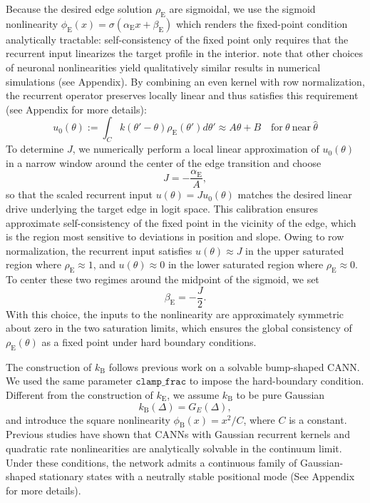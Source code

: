 \documentclass{article}
\newcommand{\rhoE}{\rho_{\text{E}}}
\newcommand{\kB}{k_{\text{B}}}
\newcommand{\kE}{k_{\text{E}}}
\newcommand{\phiB}{\phi_{\text{B}}}
\newcommand{\phiE}{\phi_{\text{E}}}
\newcommand{\alphaE}{\alpha_{\text{E}}}
\newcommand{\betaE}{\beta_{\text{E}}}
\begin{document}
Because the desired edge solution $\rhoE$ are sigmoidal, we use the sigmoid nonlinearity $\phiE(x)=\sigma(\alphaE x + \betaE)$ which renders the fixed-point condition analytically tractable:  self-consistency of the fixed point only requires that the recurrent input linearizes the target profile in the interior. note that other choices of neuronal nonlinearities yield qualitatively similar results in numerical simulations (see Appendix). By combining an even kernel with row normalization, the recurrent operator preserves locally linear and thus satisfies this requirement (see Appendix for more details):
\begin{equation}
    u_0(\theta):=\int_Ck(\theta'-\theta)\rhoE(\theta')d\theta' \approx A\theta+B \quad\text{for} \ \theta \  \text{near} \ \hat{\theta}
\end{equation}
To determine $J$, we numerically perform a local linear approximation of $u_0(\theta)$ in a narrow window around the center of the edge transition and choose 
\begin{equation}
J = -\frac{\alphaE}{A},
\end{equation}
so that the scaled recurrent input $u(\theta)=J u_0(\theta)$ matches the desired linear drive underlying the target edge in logit space. This calibration ensures approximate self-consistency of the fixed point in the vicinity of the edge, which is the region most sensitive to deviations in position and slope.
Owing to row normalization, the recurrent input satisfies $u(\theta)\approx J$ in the upper saturated region where $\rhoE\approx 1$, and $u(\theta)\approx 0$ in the lower saturated region where $\rhoE \approx 0$. To center these two regimes around the midpoint of the sigmoid, we set
\begin{equation}
\betaE = -\frac{J}{2}.
\end{equation}
With this choice, the inputs to the nonlinearity are approximately symmetric about zero in the two saturation limits, which ensures the global consistency of $\rhoE(\theta)$ as a fixed point under hard boundary conditions.

The construction of $\kB$ follows previous work on a solvable bump-shaped CANN.
We used the same parameter $\texttt{clamp\_frac}$ to impose the hard-boundary condition. Different from the construction of $\kE$, we assume $\kB$ to be pure Gaussian
\begin{equation}
    \kB(\Delta) = G_E(\Delta),
\end{equation}
and introduce the square nonlinearity $\phiB(x) = x^2/C$, where $C$ is a constant. Previous studies have shown that CANNs with Gaussian recurrent kernels and quadratic rate nonlinearities are analytically solvable in the continuum limit.
Under these conditions, the network admits a continuous family of Gaussian-shaped stationary states with a neutrally stable positional mode (See Appendix for more details).
\end{document}
